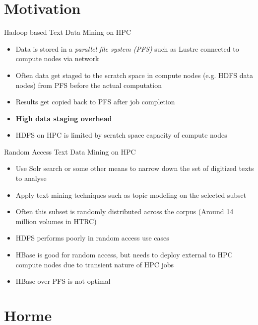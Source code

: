 \documentclass[newPxFont]{beamer}
\begin{document}
\section{Motivation}

\begin{frame}[c]{Hadoop based Text Data Mining on HPC}
  \begin{itemize}
    \item Data is stored in a \emph{parallel file system (PFS)} such as Lustre connected to compute nodes via network
    \item Often data get staged to the scratch space in compute nodes (e.g. HDFS data nodes) from PFS before the actual computation
    \item Results get copied back to PFS after job completion
    \item \textbf{High data staging overhead}
    \item HDFS on HPC is limited by scratch space capacity of compute nodes
  \end{itemize}
\end{frame}

\begin{frame}[c]{Random Access Text Data Mining on HPC}
  \begin{itemize}
    \item Use Solr search or some other means to narrow down the set of digitized texts to analyse
    \item Apply text mining techniques such as topic modeling on the selected subset
    \item Often this subset is randomly distributed across the corpus (Around 14 million volumes in HTRC)
    \item HDFS performs poorly in random access use cases
    \item HBase is good for random access, but needs to deploy external to HPC compute nodes due to transient nature of HPC jobs
    \item HBase over PFS is not optimal
  \end{itemize}
\end{frame}

\section{Horme}
\begin{frame}[c]{}
  
\end{frame}
\end{document}
